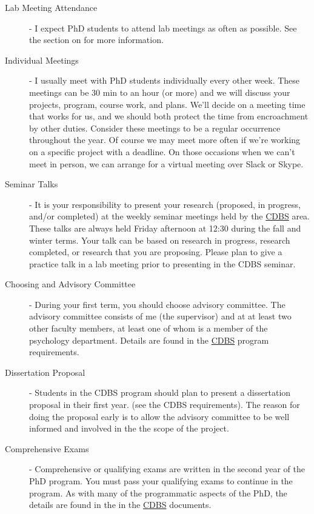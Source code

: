 \documentclass{article}
\begin{document}
\begin{description}

\item [Lab Meeting Attendance] - I expect PhD students to attend lab meetings as often as possible. See the section on  for more information.

\item [Individual Meetings] - I usually meet with PhD students individually every other week. These meetings can be 30 min to an hour (or more) and we will discuss your projects, program, course work, and plans. We'll decide on a meeting time that works for us, and we should both protect the time from encroachment by other duties. Consider these meetings to be a regular occurrence throughout the year. Of course we may meet more often if we're working on a specific project with a deadline. On those occasions when we can't meet in person, we can arrange for a virtual meeting over Slack or Skype.

\item [Seminar Talks] - It is your responsibility to present your research (proposed, in progress, and/or completed) at the weekly seminar meetings held by the \href{http://psychology.uwo.ca/graduate/program_information/cdbs_program_requirements.html} {CDBS} area. These talks are always held Friday afternoon at 12:30 during the fall and winter terms. Your talk can be based on research in progress, research completed, or research that you are proposing. Please plan to give a practice talk in a lab meeting prior to presenting in the CDBS seminar. 

\item [Choosing and Advisory Committee] - During your first term, you should choose advisory committee. The advisory committee consists of me (the supervisor) and at at least two other faculty members, at least one of whom is a member of the psychology department. Details are found in the \href{http://psychology.uwo.ca/graduate/program_information/cdbs_program_requirements.html} {CDBS} program requirements.

\item[Dissertation Proposal] - Students in the CDBS program should plan to present a dissertation proposal in their first year. (see the CDBS requirements). The reason for doing the proposal early is to allow the advisory committee to be well informed and involved in the the scope of the project.

\item [Comprehensive Exams] - Comprehensive or qualifying exams are written in the second year of the PhD program. You must pass your qualifying exams to continue in the program. As with many of the programmatic aspects of the PhD, the details are found in the in the \href{http://psychology.uwo.ca/graduate/program_information/cdbs_program_requirements.html} {CDBS} documents. 


\end{description}
\end{document}
